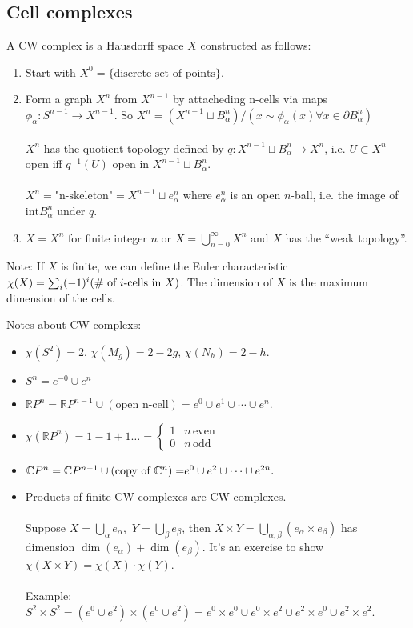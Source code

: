 \subsection{Cell complexes}
\begin{defn}
A CW complex is a Hausdorff space $X$ constructed as follows:\end{defn}
\begin{enumerate}
\item Start with $X^{0}=\{\text{discrete set of points}\}$.
\item Form a graph $X^{n}$ from $X^{n-1}$ by attacheding n-cells via maps
$\phi_{\alpha}:S^{n-1}\to X^{n-1}$. So $X^{n}=(X^{n-1}\sqcup B_{\alpha}^{n})/(x\sim\phi_{\alpha}(x)\forall x\in\partial B_{\alpha}^{n})$\\
\\
$X^{n}$ has the quotient topology defined by $q:X^{n-1}\sqcup B_{\alpha}^{n}\to X^{n}$,
i.e. $U\subset X^{n}$ open iff $q^{-1}(U)$ open in $X^{n-1}\sqcup B_{\alpha}^{n}$.\\
\\
$X^{n}=\text{"n-skeleton"}=X^{n-1}\sqcup e_{\alpha}^{n}$ where $e_{\alpha}^{n}$
is an open $n$-ball, i.e. the image of $\text{int}B_{\alpha}^{n}$
under $q$.
\item $X=X^{n}$ for finite integer $n$ or $X=\bigcup_{n=0}^{\infty}X^{n}$
and $X$ has the ``weak topology''.
\end{enumerate}
Note: If $X$ is finite, we can define the Euler characteristic $\chi(X)=\sum_{i}(-1)^{i}(\text{\# of \ensuremath{i}-cells in \ensuremath{X})}$.
The dimension of $X$ is the maximum dimension of the cells.

Notes about CW complexs:
\begin{itemize}
\item $\chi(S^{2})=2$, $\chi(M_{g})=2-2g$, $\chi(N_{h})=2-h$.
\item $S^{n}=e^{-0}\cup e^{n}$
\item $\mathbb{R}P^{n}=\mathbb{R}P^{n-1}\cup(\text{open n-cell})=e^{0}\cup e^{1}\cup\cdots\cup e^{n}$.
\item $\chi(\mathbb{R}P^{n})=1-1+1\dots=\begin{cases}
1 & n\,\text{even}\\
0 & n\,\text{odd}
\end{cases}$
\item $\mathbb{C}P^{n}=\mathbb{C}P^{n-1}\cup(\text{copy of \ensuremath{\mathbb{C}^{n})=}}e^{0}\cup e^{2}\cup\cdots\cup e^{2n}.$
\item Products of finite CW complexes are CW complexes.\\
\\
Suppose $X=\bigcup_{\alpha}e_{\alpha},$ $Y=\bigcup_{\beta}e_{\beta}$,
then $X\times Y=\bigcup_{\alpha,\beta}(e_{\alpha}\times e_{\beta})$
has dimension $\dim(e_{\alpha})+\dim(e_{\beta})$. It's an exercise
to show $\chi(X\times Y)=\chi(X)\cdot\chi(Y)$.\\
\\
Example: $S^{2}\times S^{2}=(e^{0}\cup e^{2})\times(e^{0}\cup e^{2})=e^{0}\times e^{0}\cup e^{0}\times e^{2}\cup e^{2}\times e^{0}\cup e^{2}\times e^{2}$.
\end{itemize}
